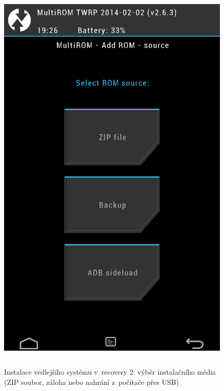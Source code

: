 \documentclass[12pt, a4paper, oneside]{article}
\begin{document}
\begin{figure}[H]
\begin{center}
 \includegraphics[height=550pt]{../img/recovery_install2.png}
\caption{Instalace vedlejšího systému v~recovery 2: výběr instalačního média (ZIP soubor, záloha nebo nahrání z~počítače přes USB)}
\end{center}
\end{figure}
\end{document}
